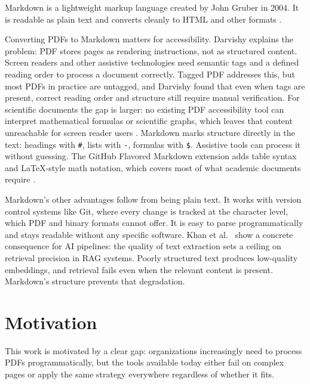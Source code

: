 Markdown is a lightweight markup language created by John Gruber in 2004.
It is readable as plain text and converts cleanly to HTML and other formats
\autocite{cone2019}.

Converting PDFs to Markdown matters for accessibility. Darvishy
\autocite{darvishy2018} explains the problem: PDF stores pages as rendering
instructions, not as structured content. Screen readers and other assistive
technologies need semantic tags and a defined reading order to process a
document correctly. Tagged PDF addresses this, but most PDFs in practice are
untagged, and Darvishy found that even when tags are present, correct reading
order and structure still require manual verification. For scientific documents
the gap is larger: no existing PDF accessibility tool can interpret
mathematical formulas or scientific graphs, which leaves that content
unreachable for screen reader users \autocite{darvishy2018}. Markdown marks structure directly in the text: headings with \texttt{\#},
lists with \texttt{-}, formulas with \texttt{\$}. Assistive tools can
process it without guessing. The GitHub Flavored Markdown extension adds table syntax and
\LaTeX-style math notation, which covers most of what academic documents
require \autocite{duan2025}.

Markdown's other advantages follow from being plain text. It works with
version control systems like Git, where every change is tracked at the
character level, which PDF and binary formats cannot offer. It is easy to
parse programmatically and stays readable without any specific software.
Khan et al.\ \autocite{khan2024} show a concrete consequence for AI pipelines:
the quality of text extraction sets a ceiling on retrieval precision in RAG
systems. Poorly structured text produces low-quality embeddings, and retrieval
fails even when the relevant content is present. Markdown's structure prevents
that degradation.

\section{Motivation}

This work is motivated by a clear gap: organizations increasingly need to
process PDFs programmatically, but the tools available today either fail on
complex pages or apply the same strategy everywhere regardless of whether it
fits.

